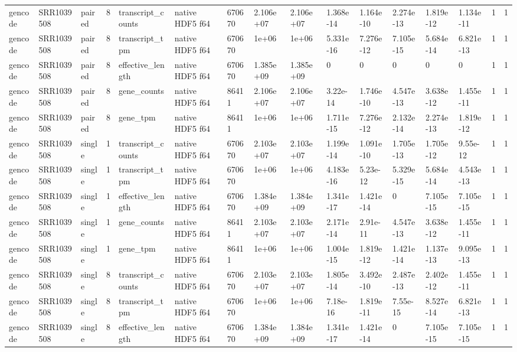 \begin{tabular}{llllllllllllllll}
gencode & SRR1039508 & paired & 8 & transcript\_counts & native HDF5 f64 & 670670 & 2.106e+07 & 2.106e+07 & 1.368e-14 & 1.164e-10 & 2.274e-13 & 1.819e-12 & 1.134e-11 & 1 & 1 \\
gencode & SRR1039508 & paired & 8 & transcript\_tpm & native HDF5 f64 & 670670 & 1e+06 & 1e+06 & 5.331e-16 & 7.276e-12 & 7.105e-15 & 5.684e-14 & 6.821e-13 & 1 & 1 \\
gencode & SRR1039508 & paired & 8 & effective\_length & native HDF5 f64 & 670670 & 1.385e+09 & 1.385e+09 & 0 & 0 & 0 & 0 & 0 & 1 & 1 \\
gencode & SRR1039508 & paired & 8 & gene\_counts & native HDF5 f64 & 86411 & 2.106e+07 & 2.106e+07 & 3.22e-14 & 1.746e-10 & 4.547e-13 & 3.638e-12 & 1.455e-11 & 1 & 1 \\
gencode & SRR1039508 & paired & 8 & gene\_tpm & native HDF5 f64 & 86411 & 1e+06 & 1e+06 & 1.711e-15 & 7.276e-12 & 2.132e-14 & 2.274e-13 & 1.819e-12 & 1 & 1 \\
gencode & SRR1039508 & single & 1 & transcript\_counts & native HDF5 f64 & 670670 & 2.103e+07 & 2.103e+07 & 1.199e-14 & 1.091e-10 & 1.705e-13 & 1.705e-12 & 9.55e-12 & 1 & 1 \\
gencode & SRR1039508 & single & 1 & transcript\_tpm & native HDF5 f64 & 670670 & 1e+06 & 1e+06 & 4.183e-16 & 5.23e-12 & 5.329e-15 & 5.684e-14 & 4.543e-13 & 1 & 1 \\
gencode & SRR1039508 & single & 1 & effective\_length & native HDF5 f64 & 670670 & 1.384e+09 & 1.384e+09 & 1.341e-17 & 1.421e-14 & 0 & 7.105e-15 & 7.105e-15 & 1 & 1 \\
gencode & SRR1039508 & single & 1 & gene\_counts & native HDF5 f64 & 86411 & 2.103e+07 & 2.103e+07 & 2.171e-14 & 2.91e-11 & 4.547e-13 & 3.638e-12 & 1.455e-11 & 1 & 1 \\
gencode & SRR1039508 & single & 1 & gene\_tpm & native HDF5 f64 & 86411 & 1e+06 & 1e+06 & 1.004e-15 & 1.819e-12 & 1.421e-14 & 1.137e-13 & 9.095e-13 & 1 & 1 \\
gencode & SRR1039508 & single & 8 & transcript\_counts & native HDF5 f64 & 670670 & 2.103e+07 & 2.103e+07 & 1.805e-14 & 3.492e-10 & 2.487e-13 & 2.402e-12 & 1.455e-11 & 1 & 1 \\
gencode & SRR1039508 & single & 8 & transcript\_tpm & native HDF5 f64 & 670670 & 1e+06 & 1e+06 & 7.18e-16 & 1.819e-11 & 7.55e-15 & 8.527e-14 & 6.821e-13 & 1 & 1 \\
gencode & SRR1039508 & single & 8 & effective\_length & native HDF5 f64 & 670670 & 1.384e+09 & 1.384e+09 & 1.341e-17 & 1.421e-14 & 0 & 7.105e-15 & 7.105e-15 & 1 & 1 \\

\end{tabular}
